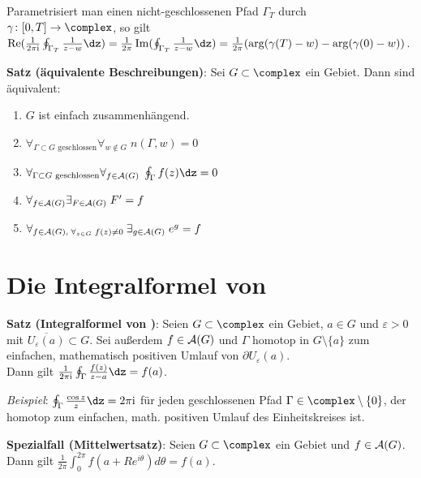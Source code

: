 Parametrisiert man einen nicht-geschlossenen Pfad
$\Gamma_T$ durch $\gamma\colon [0, T] \rightarrow \complex$, so gilt\\
$\Re(\frac{1}{2\pi\i} \oint_{\Gamma_T} \frac{1}{z - w} \dz) =
\frac{1}{2\pi} \Im(\oint_{\Gamma_T} \frac{1}{z - w} \dz) =
\frac{1}{2\pi} (\arg(\gamma(T) - w) - \arg(\gamma(0) - w))$.

\textbf{Satz (äquivalente Beschreibungen)}:
Sei $G \subset \complex$ ein Gebiet.
Dann sind äquivalent:
\begin{enumerate}
    \item
    $G$ ist einfach zusammenhängend.

    \item
    $\forall_{\Gamma \subset G \text{ geschlossen}} \forall_{w \notin G}\;
    n(\Gamma, w) = 0$

    \item
    $\forall_{\Gamma \subset G \text{ geschlossen}} \forall_{f \in \A(G)}\;
    \oint_\Gamma f(z)\dz = 0$

    \item
    $\forall_{f \in \mathcal{A}(G)} \exists_{F \in \mathcal{A}(G)}\; F' = f$

    \item
    $\forall_{f \in \mathcal{A}(G),\; \forall_{z \in G}\; f(z) \not= 0\;}
    \exists_{g \in \mathcal{A}(G)}\; e^g = f$
\end{enumerate}

\section{%
    Die Integralformel von %
}

\textbf{Satz (Integralformel von )}:
Seien $G \subset \complex$ ein Gebiet, $a \in G$ und $\varepsilon > 0$
mit $\overline{U_\varepsilon(a)} \subset G$.
Sei außerdem $f \in \mathcal{A}(G)$ und $\Gamma$ homotop in
$G \setminus \{a\}$ zum einfachen, mathematisch positiven Umlauf von
$\partial U_\varepsilon(a)$.\\
Dann gilt $\frac{1}{2\pi\i} \oint_\Gamma \frac{f(z)}{z - a} \dz = f(a)$.

\emph{Beispiel}:
$\oint_\Gamma \frac{\cos z}{z} \dz = 2\pi\i$ für jeden geschlossenen Pfad
$\Gamma \in \complex \setminus \{0\}$, der homotop zum einfachen,
math. positiven Umlauf des Einheitskreises ist.

\textbf{Spezialfall (Mittelwertsatz)}:
Seien $G \subset \complex$ ein Gebiet und $f \in \mathcal{A}(G)$.\\
Dann gilt $\frac{1}{2\pi} \int_0^{2\pi} f(a + Re^{i\theta}) d\theta = f(a)$.

